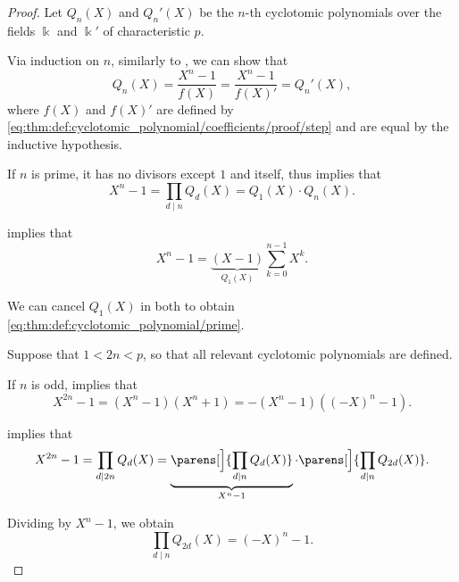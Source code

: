 \begin{proof}
   Let \( Q_n(X) \) and \( Q_n'(X) \) be the \( n \)-th cyclotomic polynomials over the fields \( \Bbbk \) and \( \Bbbk' \) of characteristic \( p \).

  Via induction on \( n \), similarly to , we can show that
  \begin{equation*}
    Q_n(X) = \frac {X^n - 1} {f(X)} = \frac {X^n - 1} {f(X)'} = Q_n'(X),
  \end{equation*}
  where \( f(X) \) and \( f(X)' \) are defined by \eqref{eq:thm:def:cyclotomic_polynomial/coefficients/proof/step} and are equal by the inductive hypothesis.

   If \( n \) is prime, it has no divisors except \( 1 \) and itself, thus  implies that
  \begin{equation*}
    X^n - 1 = \prod_{d \mid n} Q_d(X) = Q_1(X) \cdot Q_n(X).
  \end{equation*}

   implies that
  \begin{equation*}
    X^n - 1 = \underbrace{(X - 1)}_{Q_1(X)} \sum_{k=0}^{n-1} X^k.
  \end{equation*}

  We can cancel \( Q_1(X) \) in both to obtain \eqref{eq:thm:def:cyclotomic_polynomial/prime}.

   Suppose that \( 1 < 2n < p \), so that all relevant cyclotomic polynomials are defined.

  If \( n \) is odd,  implies that
  \begin{equation*}
    X^{2n} - 1 = (X^n - 1) (X^n + 1) = -(X^n - 1) ((-X)^n - 1).
  \end{equation*}

   implies that
  \begin{equation*}
    X^{2n} - 1 = \prod_{d \mid 2n} Q_d(X) = \underbrace{\parens[\Big]{ \prod_{d \mid n} Q_d(X) }}_{X^n - 1} \cdot \parens[\Big]{ \prod_{d \mid n} Q_{2d}(X) }.
  \end{equation*}

  Dividing by \( X^n - 1 \), we obtain
  \begin{equation}\label{eq:thm:def:cyclotomic_polynomial/odd/proof/recurrence}
    \prod_{d \mid n} Q_{2d}(X) = (-X)^n - 1.
  \end{equation}


\end{proof}
